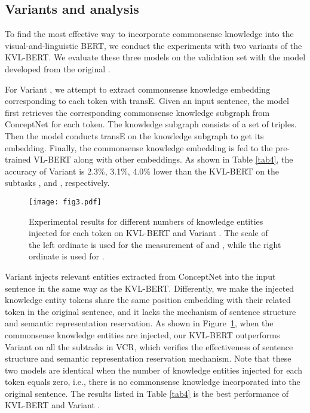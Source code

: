 \documentclass[conference]{IEEEtran}
\begin{document}
\subsection{Variants and analysis}\label{4.5}
To find the most effective way to incorporate commonsense knowledge into the visual-and-linguistic BERT, we conduct the experiments with two variants of the KVL-BERT. We evaluate these three models on the validation set with the model developed from the original .











For Variant \uppercase\expandafter{}, we attempt to extract commonsense knowledge embedding corresponding to each token with transE. Given an input sentence, the model first retrieves the corresponding commonsense knowledge subgraph from ConceptNet for each token. The knowledge subgraph consists of a set of triples. Then the model conducts transE on the knowledge subgraph to get its embedding. Finally, the commonsense knowledge embedding is fed to the pre-trained VL-BERT \cite{b14} along with other embeddings. As shown in Table \ref{tab4}, the accuracy of Variant \uppercase\expandafter{} is 2.3\%, 3.1\%, 4.0\% lower than the KVL-BERT on the subtasks ,  and , respectively.  



\begin{figure}[htp]
  \centering
  \texttt{[image: fig3.pdf]}\\
  \caption{Experimental results for different numbers of knowledge entities injected for each token on KVL-BERT and Variant \uppercase\expandafter{}. The scale of the left ordinate is used for the measurement of  and , while the right ordinate is used for .}
  
  
  
 
  \label{fig3}
\end{figure}








Variant \uppercase\expandafter{} injects relevant entities extracted from ConceptNet into the input sentence in the same way as the KVL-BERT. Differently, we make the injected knowledge entity tokens share the same position embedding with their related token in the original sentence, and it lacks the mechanism of sentence structure and semantic representation reservation. As shown in Figure~\ref{fig3}, when the commonsense knowledge entities are injected, our KVL-BERT outperforms Variant \uppercase\expandafter{} on all the subtasks in VCR, which verifies the effectiveness of sentence structure and semantic representation reservation mechanism. Note that these two models are identical when the number of knowledge entities injected for each token equals zero, i.e., there is no commonsense knowledge incorporated into the original sentence. The results listed in Table \ref{tab4} is the best performance of KVL-BERT and Variant \uppercase\expandafter{}.
 
\end{document}

